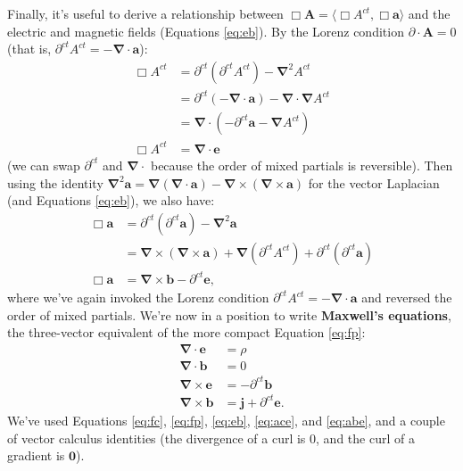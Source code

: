 \documentclass[12pt]{article}
\renewcommand{\vv}[1]{\mathbf{#1}}
\newcommand{\del}{\boldsymbol{\nabla}}
\begin{document}
Finally, it's useful to derive a relationship between $\Box \vv A = \langle \Box A^{ct}, \Box \vv a \rangle$ and the electric and magnetic fields (Equations \ref{eq:eb}). By the Lorenz condition ${\partialup \cdot \vv A = 0}$ (that is, $\partial^{ct} A^{ct} = - \del \cdot \vv a$):
\begin{equation}\label{eq:ace}
\begin{split}
\Box A^{ct} &= \partial^{ct} (\partial^{ct} A^{ct}) - \del^2 A^{ct} \\
&= \partial^{ct} (- \del \cdot \vv a) - \del \cdot \del A^{ct} \\
&= \del \cdot (- \partial^{ct} \vv a - \del A^{ct}) \\
\Box A^{ct} &= \del \cdot \vv e
\end{split}
\end{equation}
(we can swap $\partial^{ct}$ and $\del \cdot$ because the order of mixed partials is reversible). Then using the identity ${\del^2 \vv a = \del(\del \cdot \vv a) - \del \times (\del \times \vv a)}$ for the vector Laplacian (and Equations \ref{eq:eb}), we also have:
\begin{equation}\label{eq:abe}
\begin{split}
\Box \vv a &= \partial^{ct} (\partial^{ct} \vv a) - \del^2 \vv a \\
&= \del \times (\del \times \vv a) + \del(\partial^{ct} A^{ct}) + \partial^{ct} (\partial^{ct} \vv a) \\
\Box \vv a &=  \del \times \vv b - \partial^{ct} \vv e ,
\end{split}
\end{equation}
where we've again invoked the Lorenz condition $\partial^{ct} A^{ct} = - \del \cdot \vv a$ and reversed the order of mixed partials. We're now in a position to write \textbf{Maxwell's equations}, the three-vector equivalent of the more compact Equation \ref{eq:fp}:
\begin{equation}\label{eq:me}
\begin{aligned}
\del \cdot \vv e &= \rho \\
\del \cdot \vv b &= 0 \\
\del \times \vv e &= - \partial^{ct} \vv b \\
\del \times \vv b &= \vv j + \partial^{ct} \vv e .
\end{aligned}
\end{equation}
We've used Equations \ref{eq:fc}, \ref{eq:fp}, \ref{eq:eb}, \ref{eq:ace}, and \ref{eq:abe}, and a couple of vector calculus identities (the divergence of a curl is $0$, and the curl of a gradient is $\vv 0$). 
\end{document}

